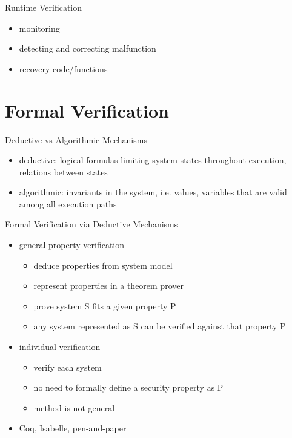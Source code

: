 \documentclass{curs}
\begin{document}
\begin{frame}{Runtime Verification}
  \begin{itemize}
    \item monitoring
    \item detecting and correcting malfunction
    \item recovery code/functions
  \end{itemize}
\end{frame}

\section{Formal Verification}

\begin{frame}{Deductive vs Algorithmic Mechanisms}
  \begin{itemize}
    \item deductive: logical formulas limiting system states throughout execution, relations between states
    \item algorithmic: invariants in the system, i.e. values, variables that are valid among all execution paths
  \end{itemize}
\end{frame}

\begin{frame}{Formal Verification via Deductive Mechanisms}
  \begin{itemize}
    \item general property verification
      \begin{itemize}
        \item deduce properties from system model
        \item represent properties in a theorem prover
        \item prove system S fits a given property P
        \item any system represented as S can be verified against that property P
      \end{itemize}
    \item individual verification
      \begin{itemize}
        \item verify each system
        \item no need to formally define a security property as P
        \item method is not general
      \end{itemize}
    \item Coq, Isabelle, pen-and-paper
  \end{itemize}
\end{frame}
\end{document}
